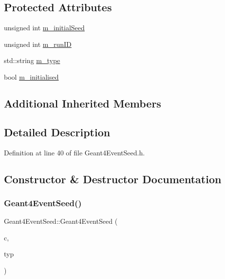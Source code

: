 \subsection*{Protected Attributes}
\begin{DoxyCompactItemize}
\item 
unsigned int \hyperlink{class_d_d4hep_1_1_simulation_1_1_geant4_event_seed_aad2e0264889e33271d97832966d516b0}{m\+\_\+initial\+Seed}
\item 
unsigned int \hyperlink{class_d_d4hep_1_1_simulation_1_1_geant4_event_seed_a0810bca4809cd7a1293ed324cb427daa}{m\+\_\+run\+ID}
\item 
std\+::string \hyperlink{class_d_d4hep_1_1_simulation_1_1_geant4_event_seed_ae04ac0bb4801305fa677c4f4bce1a1ea}{m\+\_\+type}
\item 
bool \hyperlink{class_d_d4hep_1_1_simulation_1_1_geant4_event_seed_a8fa0790e30cdbac4a172af5ff0fd7cc7}{m\+\_\+initialised}
\end{DoxyCompactItemize}
\subsection*{Additional Inherited Members}


\subsection{Detailed Description}


Definition at line 40 of file Geant4\+Event\+Seed.\+h.



\subsection{Constructor \& Destructor Documentation}
\hypertarget{class_d_d4hep_1_1_simulation_1_1_geant4_event_seed_af30e767cc26c46b017fa8ce36fc8c906}{}\label{class_d_d4hep_1_1_simulation_1_1_geant4_event_seed_af30e767cc26c46b017fa8ce36fc8c906} 
\subsubsection{\texorpdfstring{Geant4\+Event\+Seed()}{Geant4EventSeed()}}
{\footnotesize\ttfamily Geant4\+Event\+Seed\+::\+Geant4\+Event\+Seed (\begin{DoxyParamCaption}\item[{\hyperlink{class_d_d4hep_1_1_simulation_1_1_geant4_context}{Geant4\+Context} $\ast$}]{c,  }\item[{const std\+::string \&}]{typ }\end{DoxyParamCaption})}



